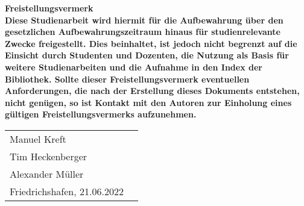 \thispagestyle{empty}
\begin{center}
	\vspace*{2cm}
	\Huge\bf Freistellungsvermerk\\
	\vspace*{3cm}
	\normalsize\rm
    Diese Studienarbeit wird hiermit für die Aufbewahrung über den gesetzlichen Aufbewahrungszeitraum hinaus für studienrelevante Zwecke freigestellt. Dies beinhaltet, ist jedoch
    nicht begrenzt auf die Einsicht durch Studenten und Dozenten, die Nutzung als Basis für
    weitere Studienarbeiten und die Aufnahme in den Index der Bibliothek.
    Sollte dieser Freistellungsvermerk eventuellen Anforderungen, die nach der Erstellung
    dieses Dokuments entstehen, nicht genügen, so ist Kontakt mit den Autoren zur Einholung
    eines gültigen Freistellungsvermerks aufzunehmen.\\
	\vfill
\end{center}
\begin{tabular}{ll}
    Manuel Kreft\\
    Tim Heckenberger\\
    Alexander Müller\\
	Friedrichshafen, 21.06.2022 
\end{tabular}
